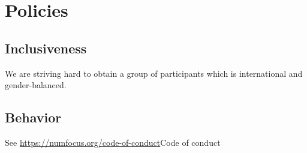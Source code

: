 \documentclass{article}[11pt]
\begin{document}
\section*{Policies}

\subsection*{Inclusiveness}
 We are striving hard to obtain a group of participants which is international and gender-balanced.

\subsection*{Behavior}
See \url{https://numfocus.org/code-of-conduct}{Code of conduct}

\subsection*{}
\end{document}

